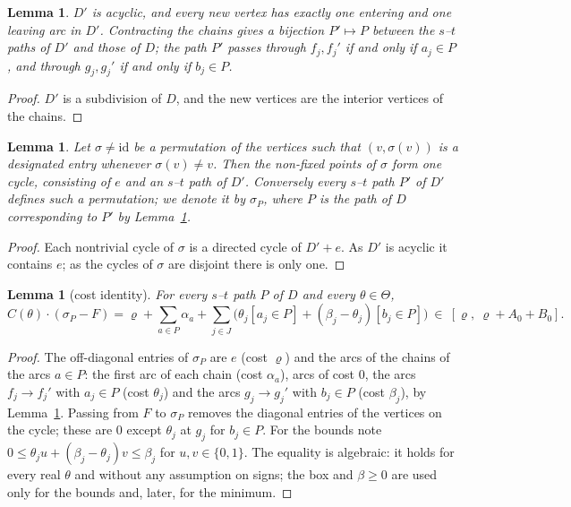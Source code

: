 \documentclass[11pt]{amsart}
\theoremstyle{plain}
\newtheorem{lemma}[theorem]{Lemma}
\theoremstyle{definition}
\theoremstyle{remark}
\begin{document}
\begin{lemma}\label{lem:paths}
$D'$ is acyclic, and every new vertex has exactly one entering and one leaving arc in $D'$. Contracting the chains
gives a bijection $P'\mapsto P$ between the $s$--$t$ paths of $D'$ and those of $D$; the path $P'$ passes through
$f_j,f_j'$ if and only if $a_j\in P$, and through $g_j,g_j'$ if and only if $b_j\in P$.
\end{lemma}
\begin{proof}
$D'$ is a subdivision of $D$, and the new vertices are the interior vertices of the chains.
\end{proof}

\begin{lemma}\label{lem:perm}
Let $\sigma\ne\mathrm{id}$ be a permutation of the vertices such that $(v,\sigma(v))$ is a designated entry whenever
$\sigma(v)\ne v$. Then the non-fixed points of $\sigma$ form one cycle, consisting of $e$ and an $s$--$t$ path of
$D'$. Conversely every $s$--$t$ path $P'$ of $D'$ defines such a permutation; we denote it by $\sigma_P$, where $P$ is
the path of $D$ corresponding to $P'$ by Lemma~\ref{lem:paths}.
\end{lemma}
\begin{proof}
Each nontrivial cycle of $\sigma$ is a directed cycle of $D'+e$. As $D'$ is acyclic it contains $e$; as the cycles
of $\sigma$ are disjoint there is only one.
\end{proof}

\begin{lemma}[cost identity]\label{lem:cost}
For every $s$--$t$ path $P$ of $D$ and every $\theta\in\Theta$,
\[
 C(\theta)\cdot(\sigma_P-F)=\varrho+\sum_{a\in P}\alpha_a
   +\sum_{j\in J}\bigl(\theta_j[a_j\in P]+(\beta_j-\theta_j)[b_j\in P]\bigr)\ \in\ [\varrho,\ \varrho+A_0+B_0].
\]
\end{lemma}
\begin{proof}
The off-diagonal entries of $\sigma_P$ are $e$ (cost $\varrho$) and the arcs of the chains of the arcs $a\in P$: the
first arc of each chain (cost $\alpha_a$), arcs of cost $0$, the arcs $f_j\to f_j'$ with $a_j\in P$ (cost
$\theta_j$) and the arcs $g_j\to g_j'$ with $b_j\in P$ (cost $\beta_j$), by Lemma~\ref{lem:paths}. Passing from $F$
to $\sigma_P$ removes the diagonal entries of the vertices on the cycle; these are $0$ except $\theta_j$ at $g_j$ for
$b_j\in P$. For the bounds note $0\le\theta_ju+(\beta_j-\theta_j)v\le\beta_j$ for $u,v\in\{0,1\}$.
The equality is algebraic: it holds for every real $\theta$ and without any assumption on signs; the box and
$\beta\ge0$ are used only for the bounds and, later, for the minimum.
\end{proof}
\end{document}
